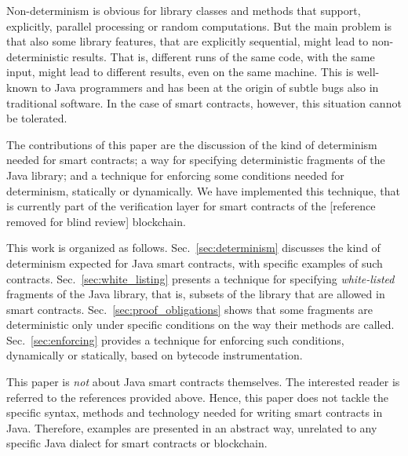 Non-determinism is obvious for library classes and methods that support, explicitly,
parallel processing or random computations. But the main problem is that
also some library features, that are explicitly sequential, might lead to
non-deterministic results. That is, different runs of the same code, with the
same input, might lead to different results, even on the same machine.
This is well-known to Java programmers and has been at the origin of subtle
bugs also in traditional software. In the case of smart contracts, however,
this situation cannot be tolerated.

The contributions of this paper are the discussion of the kind of determinism
needed for smart contracts; a way for specifying deterministic fragments
of the Java library; and a technique for
enforcing some conditions needed for determinism, statically or dynamically.
We have implemented this technique, that is currently part of the verification
layer for smart contracts of the [reference removed for blind review] blockchain.

This work is organized as follows.
Sec.~\ref{sec:determinism} discusses the kind of determinism expected for Java smart contracts,
with specific examples of such contracts.
Sec.~\ref{sec:white_listing} presents a technique for specifying \emph{white-listed} fragments of the Java library,
that is, subsets of the library that are allowed in smart contracts.
Sec.~\ref{sec:proof_obligations} shows that
some fragments are deterministic only under specific conditions on the way their methods
are called.
Sec.~\ref{sec:enforcing} provides a technique for enforcing such conditions, dynamically
or statically, based on bytecode instrumentation.

This paper is \emph{not} about Java smart contracts themselves. The interested reader
is referred to the references provided above. Hence, this paper does not tackle
the specific syntax, methods and technology needed for writing smart contracts in Java.
Therefore, examples are presented in an abstract way, unrelated to any specific
Java dialect for smart contracts or blockchain.
